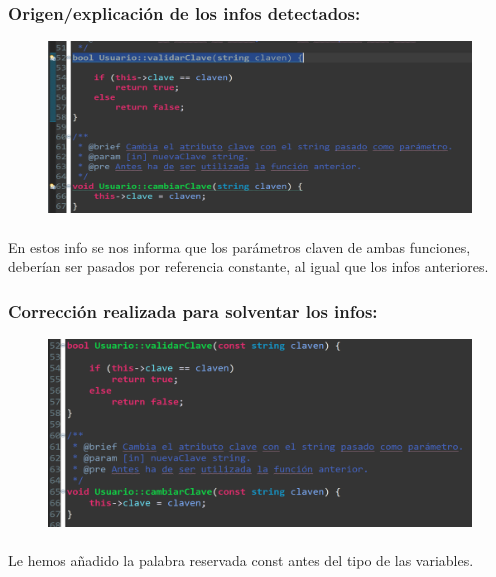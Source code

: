 		\subsubsection{Origen/explicación de los infos detectados:}
		
			\begin{figure}[H]
				\centering
				\includegraphics[scale=0.55]{img/esteban18.png}
				\label{esteban18}
			\end{figure}
		
			\paragraph{}En estos info se nos informa que los parámetros claven de ambas funciones, deberían ser pasados por referencia constante, al igual que los infos anteriores.
			
		\subsubsection{Corrección realizada para solventar los infos:}
		
			\begin{figure}[H]
				\centering
				\includegraphics[scale=0.55]{img/esteban19.png}
				\label{esteban19}
			\end{figure}
		
			\paragraph{}Le hemos añadido la palabra reservada const antes del tipo de las variables.
			
